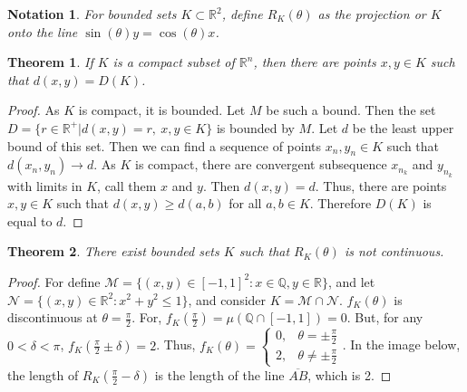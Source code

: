 \documentclass[12pt,oneside]{book}
\theoremstyle{mystyle}
\newtheorem{theorem}{Theorem}[section]
\newtheorem{notation}{Notation}[section]
\begin{document}
\begin{notation}
For bounded sets $K\subset \mathbb{R}^2$, define $R_K(\theta)$ as the projection or $K$ onto the line $\sin(\theta)y=\cos(\theta)x$.
\end{notation}

\begin{theorem}
If $K$ is a compact subset of $\mathbb{R}^n$, then there are points $x,y\in K$ such that $d(x,y)=D(K)$.
\end{theorem}
\begin{proof}
As $K$ is compact, it is bounded. Let $M$ be such a bound. Then the set $D=\{r\in \mathbb{R}^+| d(x,y) = r,\ x,y\in K\}$ is bounded by $M$. Let $d$ be the least upper bound of this set. Then we can find a sequence of points $x_n,y_n\in K$ such that $d(x_n,y_n) \rightarrow d$. As $K$ is compact, there are convergent subsequence $x_{n_k}$ and $y_{n_k}$ with limits in $K$, call them $x$ and $y$. Then $d(x,y) = d$. Thus, there are points $x,y\in K$ such that $d(x,y) \geq d(a,b)$ for all $a,b\in K$. Therefore $D(K)$ is equal to $d$.
\end{proof}

\begin{theorem}
There exist bounded sets $K$ such that $R_K(\theta)$ is not continuous.
\end{theorem}
\begin{proof}
For define $\mathcal{M} = \{(x,y)\in [-1,1]^2: x\in \mathbb{Q},y\in \mathbb{R}\}$, and let $\mathcal{N} = \{(x,y)\in \mathbb{R}^2: x^2+y^2\leq 1\}$, and consider $K = \mathcal{M}\cap \mathcal{N}$. $f_{K}(\theta)$ is discontinuous at $\theta = \frac{\pi}{2}$. For, $f_K(\frac{\pi}{2}) = \mu(\mathbb{Q}\cap [-1,1])=0$. But, for any $0<\delta < \pi$, $f_K(\frac{\pi}{2}\pm\delta) = 2$. Thus, $f_K(\theta) = \begin{cases} 0, & \theta = \pm \frac{\pi}{2} \\ 2, & \theta \ne \pm \frac{\pi}{2}\end{cases}$. In the image below, the length of $R_K(\frac{\pi}{2}-\delta)$ is the length of the line $\overline{AB}$, which is 2.
\end{proof}
\end{document}
